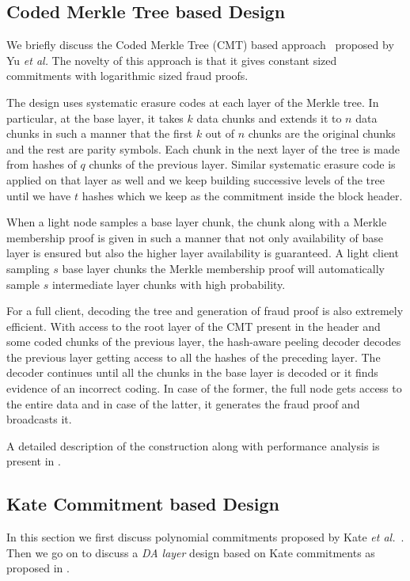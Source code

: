 \documentclass[sigconf, screen=true, nonacm]{acmart}
\newcommand{\DA}{\textit{DA layer}}
\begin{document}
    \subsection{Coded Merkle Tree based Design}
        We briefly discuss the Coded Merkle Tree (CMT) based approach~\cite{yu2019coded} proposed by Yu \textit{et al.} The novelty of this approach is that it gives constant sized commitments with logarithmic sized fraud proofs. 

        The design uses systematic erasure codes at each layer of the Merkle tree. In particular, at the base layer, it takes $k$ data chunks and extends it to $n$ data chunks in such a manner that the first $k$ out of $n$ chunks are the original chunks and the rest are parity symbols. Each chunk in the next layer of the tree is made from hashes of $q$ chunks of the previous layer. Similar systematic erasure code is applied on that layer as well and we keep building successive levels of the tree until we have $t$ hashes which we keep as the commitment inside the block header. 

        When a light node samples a base layer chunk, the chunk along with a Merkle membership proof is given in such a manner that not only availability of base layer is ensured but also the higher layer availability is guaranteed. A light client sampling $s$ base layer chunks the Merkle membership proof will automatically sample $s$ intermediate layer chunks with high probability. 

        For a full client, decoding the tree and generation of fraud proof is also extremely efficient. With access to the root layer of the CMT present in the header and some coded chunks of the previous layer, the hash-aware peeling decoder decodes the previous layer getting access to all the hashes of the preceding layer. The decoder continues until all the chunks in the base layer is decoded or it finds evidence of an incorrect coding. In case of the former, the full node gets access to the entire data and in case of the latter, it generates the fraud proof and broadcasts it. 

        A detailed description of the construction along with performance analysis is present in \cite{yu2019coded}.

    \subsection{Kate Commitment based Design}
        In this section we first discuss polynomial commitments proposed by Kate \textit{et al.}~\cite{Kate:2010}. Then we go on to discuss a \DA{} design based on Kate commitments as proposed in \cite{EthResearch_DA:2020}. 
\end{document}
